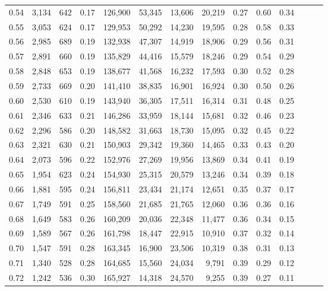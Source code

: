 \begin{tabular}{rrrrrrrrrrrrrr}
0.54 &  3,134 &  642 &  0.17 &  126,900 &   53,345 &  13,606 &  20,219 &  0.27 &  0.60 &      0.34 \\
0.55 &  3,053 &  624 &  0.17 &  129,953 &   50,292 &  14,230 &  19,595 &  0.28 &  0.58 &      0.33 \\
0.56 &  2,985 &  689 &  0.19 &  132,938 &   47,307 &  14,919 &  18,906 &  0.29 &  0.56 &      0.31 \\
0.57 &  2,891 &  660 &  0.19 &  135,829 &   44,416 &  15,579 &  18,246 &  0.29 &  0.54 &      0.29 \\
0.58 &  2,848 &  653 &  0.19 &  138,677 &   41,568 &  16,232 &  17,593 &  0.30 &  0.52 &      0.28 \\
0.59 &  2,733 &  669 &  0.20 &  141,410 &   38,835 &  16,901 &  16,924 &  0.30 &  0.50 &      0.26 \\
0.60 &  2,530 &  610 &  0.19 &  143,940 &   36,305 &  17,511 &  16,314 &  0.31 &  0.48 &      0.25 \\
0.61 &  2,346 &  633 &  0.21 &  146,286 &   33,959 &  18,144 &  15,681 &  0.32 &  0.46 &      0.23 \\
0.62 &  2,296 &  586 &  0.20 &  148,582 &   31,663 &  18,730 &  15,095 &  0.32 &  0.45 &      0.22 \\
0.63 &  2,321 &  630 &  0.21 &  150,903 &   29,342 &  19,360 &  14,465 &  0.33 &  0.43 &      0.20 \\
0.64 &  2,073 &  596 &  0.22 &  152,976 &   27,269 &  19,956 &  13,869 &  0.34 &  0.41 &      0.19 \\
0.65 &  1,954 &  623 &  0.24 &  154,930 &   25,315 &  20,579 &  13,246 &  0.34 &  0.39 &      0.18 \\
0.66 &  1,881 &  595 &  0.24 &  156,811 &   23,434 &  21,174 &  12,651 &  0.35 &  0.37 &      0.17 \\
0.67 &  1,749 &  591 &  0.25 &  158,560 &   21,685 &  21,765 &  12,060 &  0.36 &  0.36 &      0.16 \\
0.68 &  1,649 &  583 &  0.26 &  160,209 &   20,036 &  22,348 &  11,477 &  0.36 &  0.34 &      0.15 \\
0.69 &  1,589 &  567 &  0.26 &  161,798 &   18,447 &  22,915 &  10,910 &  0.37 &  0.32 &      0.14 \\
0.70 &  1,547 &  591 &  0.28 &  163,345 &   16,900 &  23,506 &  10,319 &  0.38 &  0.31 &      0.13 \\
0.71 &  1,340 &  528 &  0.28 &  164,685 &   15,560 &  24,034 &   9,791 &  0.39 &  0.29 &      0.12 \\
0.72 &  1,242 &  536 &  0.30 &  165,927 &   14,318 &  24,570 &   9,255 &  0.39 &  0.27 &      0.11 \\

\end{tabular}
